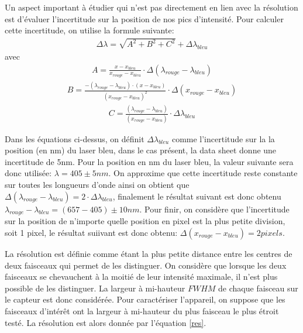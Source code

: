\documentclass[11pt,letterpaper]{article}
\begin{document}
Un aspect important à étudier qui n'est pas directement en lien avec la résolution est d'évaluer l'incertitude sur 
la position de nos pics d'intensité. Pour calculer cette incertitude, on utilise la formule suivante: 
\begin{align}\label{GratingEq}
  \Delta \lambda =\sqrt{A^{2}+B^{2}+C^{2}}+\Delta \lambda _{bleu}
\end{align}
avec 
\begin{align}\label{GratingEq}
  A=\frac{x-x_{bleu}}{x_{rouge}-x_{bleu}}\cdot \Delta\left ( \lambda _{rouge}-\lambda _{bleu} \right )
\end{align}
\begin{align}\label{GratingEq}
  B=\frac{-(\lambda _{rouge}-\lambda _{bleu})\cdot (x-x_{bleu})}{(x_{rouge}-x_{bleu})^{2}} \cdot \Delta \left ( x_{rouge}-x_{bleu} \right )
\end{align}
\begin{align}\label{GratingEq}
  C=\frac{(\lambda _{rouge}-\lambda _{bleu})}{(x_{rouge}-x_{bleu})}\cdot \Delta \lambda _{bleu}
\end{align}

Dans les équations ci-dessus, on définit $\Delta \lambda _{bleu}$ comme l'incertitude sur la la position (en nm)
du laser bleu, dans le cas présent, la data sheet donne une incertitude de 5nm. Pour la position en nm du laser bleu,
la valeur suivante sera donc utilisée: $ \lambda = 405\pm 5 nm$. On approxime que cette incertitude reste constante sur 
toutes les longueurs d'onde ainsi on obtient que $\Delta\left ( \lambda _{rouge}-\lambda _{bleu} \right )=2\cdot \Delta \lambda _{bleu}$, 
finalement le résultat suivant est donc obtenu $\lambda _{rouge}-\lambda _{bleu}= (657-405)\pm 10 nm$.
Pour finir, on considère que l'incertitude sur la position de n'importe quelle position en pixel est la plus petite
division, soit 1 pixel, le résultat suiivant est donc obtenu: $\Delta \left ( x_{rouge}-x_{bleu} \right )=2 pixels$.


La résolution est définie comme étant la plus petite distance entre les centres de deux
faisceaux qui permet de les distinguer. On considère que lorsque les deux faisceaux se 
chevauchent à la moitié de leur intensité maximale, il n'est plus possible de les distinguer.
La largeur à mi-hauteur $FWHM$ de chaque faisceau sur le capteur est donc considérée. Pour 
caractériser l'appareil, on suppose que les faisceaux d'intérêt ont la largeur à mi-hauteur
du plus faisceau le plus étroit testé. La résolution est alors donnée par l'équation \ref{res}.
\end{document}
